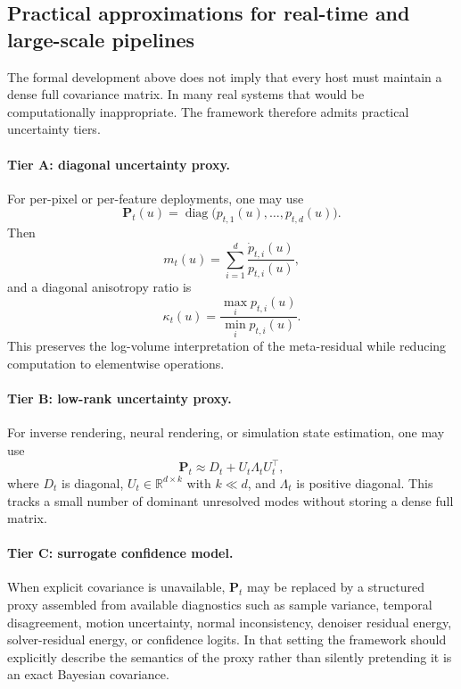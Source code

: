 \documentclass[11pt]{article}
\newcommand{\R}{\mathbb{R}}
\newcommand{\covar}{\mathbf{P}}
\newcommand{\metares}{m}
\newcommand{\diag}{\operatorname{diag}}
\theoremstyle{definition}
\theoremstyle{plain}
\begin{document}
\subsection{Practical approximations for real-time and large-scale pipelines}
The formal development above does not imply that every host must maintain a dense full covariance matrix. In many real systems that would be computationally inappropriate. The framework therefore admits practical uncertainty tiers.

\paragraph{Tier A: diagonal uncertainty proxy.}
For per-pixel or per-feature deployments, one may use
\begin{equation}
    \covar_t(u) = \diag\big(p_{t,1}(u),\dots,p_{t,d}(u)\big).
\end{equation}
Then
\begin{equation}
    \metares_t(u) = \sum_{i=1}^{d} \frac{\dot p_{t,i}(u)}{p_{t,i}(u)},
\end{equation}
and a diagonal anisotropy ratio is
\begin{equation}
    \kappa_t(u) = \frac{\max_i p_{t,i}(u)}{\min_i p_{t,i}(u)}.
\end{equation}
This preserves the log-volume interpretation of the meta-residual while reducing computation to elementwise operations.

\paragraph{Tier B: low-rank uncertainty proxy.}
For inverse rendering, neural rendering, or simulation state estimation, one may use
\begin{equation}
    \covar_t \approx D_t + U_t \Lambda_t U_t^\top,
\end{equation}
where $D_t$ is diagonal, $U_t \in \R^{d\times k}$ with $k \ll d$, and $\Lambda_t$ is positive diagonal. This tracks a small number of dominant unresolved modes without storing a dense full matrix.

\paragraph{Tier C: surrogate confidence model.}
When explicit covariance is unavailable, $\covar_t$ may be replaced by a structured proxy assembled from available diagnostics such as sample variance, temporal disagreement, motion uncertainty, normal inconsistency, denoiser residual energy, solver-residual energy, or confidence logits. In that setting the framework should explicitly describe the semantics of the proxy rather than silently pretending it is an exact Bayesian covariance.
\end{document}
